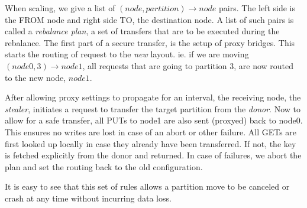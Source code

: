 When scaling, we give a list of $(node, partition) \rightarrow node$ pairs. The left side is the FROM node and right side TO, the destination node.
A list of such pairs is called a \emph{rebalance plan}, a set of transfers that are to be executed during the rebalance.
The first part of a secure transfer, is the setup of proxy bridges. This starts the routing of request to the \emph{new} layout. ie. if we are moving $(node0, 3) \rightarrow node1$, all requests that are going to partition 3, are now routed to the new node, $node1$. 

After allowing proxy settings to propagate for an interval, the receiving node, the \emph{stealer}, initiates a request to transfer the target partition from the \emph{donor}. 
Now to allow for a safe transfer, all PUTs to node1 are also sent (proxyed) back to node0. This ensures no writes are lost in case of an abort or other failure. All GETs are first looked up locally in case they already have been transferred. If not, the key is fetched explicitly from the donor and returned.
In case of failures, we abort the plan and set the routing back to the old configuration.

It is easy to see that this set of rules allows a partition move to be canceled or crash at any time without incurring data loss.

